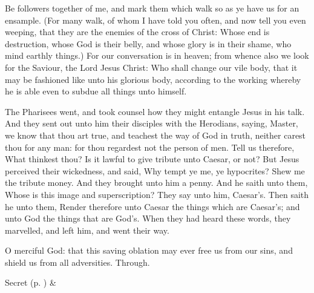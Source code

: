  Be followers together of me, and mark them which walk so as ye have us for an ensample. (For many walk, of whom I have told you often, and now tell you even weeping, that they are the enemies of the cross of Christ: Whose end is destruction, whose God is their belly, and whose glory is in their shame, who mind earthly things.) For our conversation is in heaven; from whence also we look for the Saviour, the Lord Jesus Christ: Who shall change our vile body, that it may be fashioned like unto his glorious body, according to the working whereby he is able even to subdue all things unto himself.


 The Pharisees went, and took counsel how they might entangle Jesus in his talk. And they sent out unto him their disciples with the Herodians, saying, Master, we know that thou art true, and teachest the way of God in truth, neither carest thou for any man: for thou regardest not the person of men. Tell us therefore, What thinkest thou? Is it lawful to give tribute unto Caesar, or not? But Jesus perceived their wickedness, and said, Why tempt ye me, ye hypocrites? Shew me the tribute money. And they brought unto him a penny. And he saith unto them, Whose is this image and superscription? They say unto him, Caesar's. Then saith he unto them, Render therefore unto Caesar the things which are Caesar's; and unto God the things that are God's. When they had heard these words, they marvelled, and left him, and went their way.


\secret
{} O merciful God: that this saving oblation may ever free us from our sins, and shield us from all adversities. Through.


\begin{rubric}
     Secret  (p. \pageref{SPSaints}) \&  
\end{rubric}

